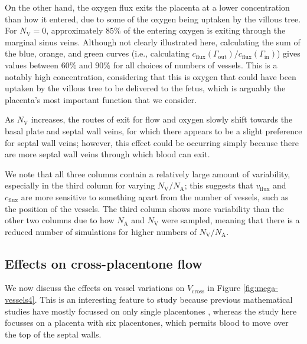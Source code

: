             On the other hand, the oxygen flux exits the placenta at a lower concentration than how it entered, due to some of the oxygen being uptaken by the villous tree. For $N_\text{V} = 0$, approximately $85\%$ of the entering oxygen is exiting through the marginal sinus veins. Although not clearly illustrated here, calculating the sum of the blue, orange, and green curves (i.e., calculating $c_\text{flux}(\Gamma_\text{out})/c_\text{flux}(\Gamma_\text{in})$) gives values between $60\%$ and $90\%$ for all choices of numbers of vessels. This is a notably high concentration, considering that this is oxygen that could have been uptaken by the villous tree to be delivered to the fetus, which is arguably the placenta's most important function that we consider.
            
            As $N_\text{V}$ increases, the routes of exit for flow and oxygen slowly shift towards the basal plate and septal wall veins, for which there appears to be a slight preference for septal wall veins; however, this effect could be occurring simply because there are more septal wall veins through which blood can exit.

            We note that all three columns contain a relatively large amount of variability, especially in the third column for varying $N_\text{V}/N_\text{A}$; this suggests that $v_\text{flux}$ and $c_\text{flux}$ are more sensitive to something apart from the number of vessels, such as the position of the vessels. The third column shows more variability than the other two columns due to how $N_\text{A}$ and $N_\text{V}$ were sampled, meaning that there is a reduced number of simulations for higher numbers of $N_\text{V}/N_\text{A}$.

        \subsection{Effects on cross-placentone flow}
            We now discuss the effects on vessel variations on $V_\text{cross}$ in Figure \ref{fig:mega-vessels4}. This is an interesting feature to study because previous mathematical studies have mostly focussed on only single placentones \cite{lecarpentierComputationalFluidDynamic2016,chernyavskyMathematicalModelIntervillous2010}, whereas the study here focusses on a placenta with six placentones, which permits blood to move over the top of the septal walls.

